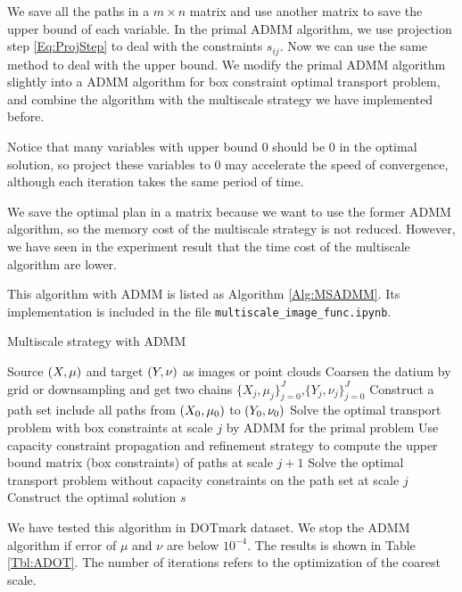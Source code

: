 \documentclass[english]{pkupaper}
\begin{document}
We save all the paths in a $m \times n$ matrix and use another matrix to save the upper bound of each variable. In the primal ADMM algorithm, we use projection step \eqref{Eq:ProjStep} to deal with the constraints $s_{ij}$. Now we can use the same method to deal with the upper bound. We modify the primal ADMM algorithm slightly into a ADMM algorithm for box constraint optimal transport problem, and combine the algorithm with the multiscale strategy we have implemented before.

Notice that many variables with upper bound $0$ should be $0$ in the optimal solution, so project these variables to $0$ may accelerate the speed of convergence, although each iteration takes the same period of time.

We save the optimal plan in a matrix because we want to use the former ADMM algorithm, so the memory cost of the multiscale strategy is not reduced. However, we have seen in the experiment result that the time cost of the multiscale algorithm are lower.

This algorithm with ADMM is listed as Algorithm \ref{Alg:MSADMM}. Its implementation is included in the file \verb"multiscale_image_func.ipynb".

\begin{algorithm} 
\caption{Multiscale strategy with ADMM} \label{Alg:MSADMM}
\begin{algorithmic}
\REQUIRE Source $ \left(  X, \mu  \right) $ and target $ \left(  Y, \nu  \right) $ as images or point clouds
\STATE Coarsen the datium by grid or downsampling and get two chains $\{ X_j, \mu_j \}^J_{j=0}$,$\{Y_j, \nu_j\}^J_{j=0}$
\STATE Construct a path set include all paths from $\left( X_0, \mu_0 \right)$ to $\left( Y_0, \nu_0 \right)$
\STATE Solve the optimal transport problem with box constraints at scale $j$ by ADMM for the primal problem
\STATE Use capacity constraint propagation and refinement strategy to compute the upper bound matrix (box constraints) of paths at scale $j + 1$
\ENDFOR
\STATE Solve the optimal transport problem without capacity constraints on the path set at scale $j$
\STATE Construct the optimal solution $s$
\end{algorithmic}
\end{algorithm}

We have tested this algorithm in DOTmark dataset. We stop the ADMM algorithm if error of $\mu$ and $\nu$ are below $10^{-4}$. The results is shown in Table \ref{Tbl:ADOT}. The number of iterations refers to the optimization of the coarest scale.
\end{document}
